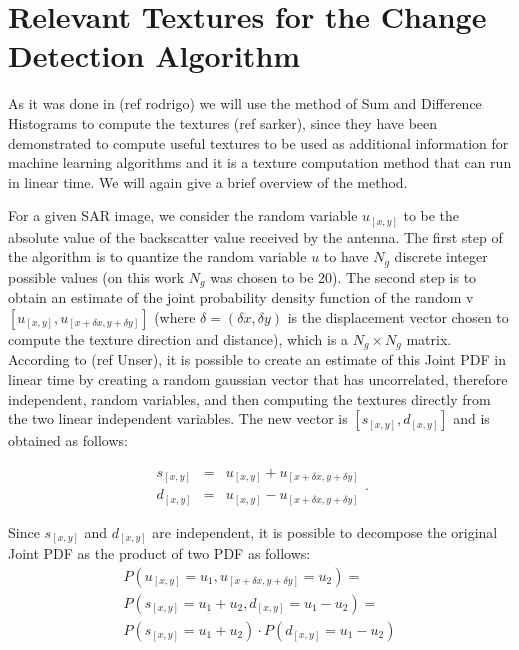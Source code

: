 \section{Relevant Textures for the Change Detection Algorithm}
As it was done in (ref rodrigo) we will use the method of Sum and Difference Histograms to compute the textures (ref sarker), since they have been demonstrated to compute 
useful textures to be used as additional information for machine learning algorithms and it is a texture computation method that can run in linear time. We will again give a brief overview of the method.

For a given SAR image, we consider the random variable $u_{[x, y]}$ to be the absolute value of the backscatter value received by the antenna. The first step of the algorithm is to 
quantize the random variable $u$ to have $N_g$ discrete integer possible values (on this work $N_g$ was chosen to be 20). The second step is to obtain an estimate of the joint probability density function of the random v $[u_{[x,y]}, u_{[x+\delta x, y+\delta y]}]$ (where $\delta = (\delta x, \delta y)$ is the displacement vector 
chosen to compute the texture direction and distance),
which is a $N_g \times N_g$ matrix. According to (ref Unser), it is possible to create an estimate of this Joint PDF in linear time by creating a random gaussian vector that has uncorrelated, therefore independent, random variables, and then computing the textures 
directly from the two linear independent variables. The new vector is $[s_{[x,y]}, d_{[x, y]}]$ and is obtained as follows:

\begin{equation}
    \begin{array}{ccc}
         s_{[x,y]} &=& u_{[x,y]} + u_{[x+\delta x, y+\delta y]} \\
         d_{[x,y]} &=& u_{[x,y]} - u_{[x+\delta x, y+\delta y]}
    \end{array}.
\end{equation} 

Since $s_{[x,y]}$ and $d_{[x,y]}$ are independent, it is possible to decompose the original Joint PDF as the product of two PDF as follows:
\begin{equation}
    \begin{array}{rrr}
       P(u_{[x,y]}=u_1, u_{[x+\delta x, y+\delta y]}=u_2) = \\ P(s_{[x,y]}=u_1+u_2, d_{[x,y]}=u_1-u_2) = \\
    P(s_{[x,y]}=u_1+u_2) \cdot P(d_{[x,y]} = u_1-u_2) 
    \end{array}
\end{equation}

